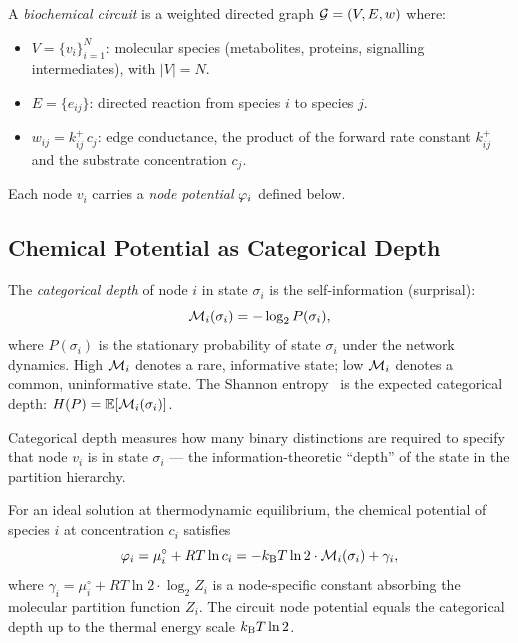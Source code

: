 \begin{definition}
\label{def:biochemical-circuit}
A \emph{biochemical circuit} is a weighted directed graph
$\mathcal{G} = (V, E, w)$ where:
\begin{itemize}[noitemsep]
  \item $V = \{v_i\}_{i=1}^{N}$: molecular species (metabolites, proteins,
        signalling intermediates), with $|V| = N$.
  \item $E = \{e_{ij}\}$: directed reaction from species $i$ to species $j$.
  \item $w_{ij} = k_{ij}^{+}\,c_j$: edge conductance, the product of the
        forward rate constant $k_{ij}^{+}$ and the substrate concentration
        $c_j$.
\end{itemize}
Each node $v_i$ carries a \emph{node potential} $\varphi_i$ defined
below.
\end{definition}

\subsection{Chemical Potential as Categorical Depth}

\begin{definition}
\label{def:categorical-depth}
The \emph{categorical depth} of node $i$ in state $\sigma_i$ is the
self-information (surprisal):
\begin{equation}
  \mathcal{M}_i(\sigma_i) = -\log_2 P(\sigma_i),
  \label{eq:catdepth}
\end{equation}
where $P(\sigma_i)$ is the stationary probability of state $\sigma_i$
under the network dynamics.  High $\mathcal{M}_i$ denotes a rare, informative
state; low $\mathcal{M}_i$ denotes a common, uninformative state.  The Shannon
entropy~\citep{Shannon1948} is the expected categorical depth:
$H(P) = \mathbb{E}[\mathcal{M}_i(\sigma_i)]$.
\end{definition}

Categorical depth measures how many binary distinctions are required to
specify that node $v_i$ is in state $\sigma_i$ --- the information-theoretic
``depth'' of the state in the partition hierarchy.

\begin{theorem}
\label{thm:mu-catdepth}
For an ideal solution at thermodynamic equilibrium, the chemical potential
of species $i$ at concentration $c_i$ satisfies
\begin{equation}
  \varphi_i
  = \mu_i^{\circ} + RT\ln c_i
  = -k_{\mathrm{B}} T \ln 2 \cdot \mathcal{M}_i(\sigma_i) + \gamma_i,
  \label{eq:mu-catdepth}
\end{equation}
where $\gamma_i = \mu_i^{\circ} + RT \ln 2 \cdot \log_2 Z_i$ is a
node-specific constant absorbing the molecular partition function $Z_i$.
The circuit node potential equals the categorical depth up to the thermal
energy scale $k_{\mathrm{B}} T \ln 2$.
\end{theorem}

